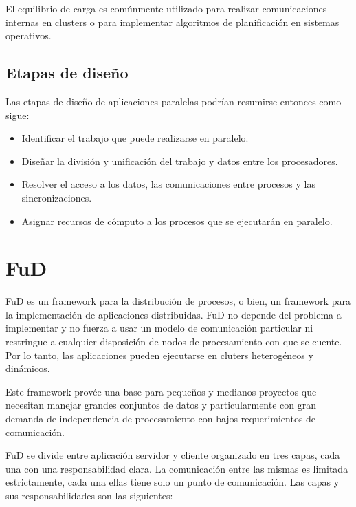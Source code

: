 El equilibrio de carga es comúnmente utilizado para realizar comunicaciones internas en clusters o para implementar algoritmos de
planificación en sistemas operativos.

\subsection{Etapas de diseño}

Las etapas de diseño de aplicaciones paralelas podrían resumirse entonces como sigue:

\begin{itemize}
 \item Identificar el trabajo que puede realizarse en paralelo.
 \item Diseñar la división y unificación del trabajo y datos entre los procesadores.
 \item Resolver el acceso a los datos, las comunicaciones entre procesos y las sincronizaciones.
 \item Asignar recursos de cómputo a los procesos que se ejecutarán en paralelo.
\end{itemize}


\section{FuD}
\label{sec:fud}

FuD es un framework para la distribución de procesos, o bien, un framework para la implementación de aplicaciones distribuidas\cite{clus09}.
FuD no depende del problema a implementar y no fuerza a usar un modelo de comunicación particular ni restringue a cualquier disposición de
nodos de procesamiento con que se cuente. Por lo tanto, las aplicaciones pueden ejecutarse en cluters heterogéneos y dinámicos.

Este framework provée una base para pequeños y medianos proyectos que necesitan manejar grandes conjuntos de datos y particularmente con
gran demanda de independencia de procesamiento con bajos requerimientos de comunicación.

FuD se divide entre aplicación servidor y cliente organizado en tres capas, cada una con una responsabilidad clara. La comunicación entre
las mismas es limitada estrictamente, cada una ellas tiene solo un punto de comunicación.
Las capas y sus responsabilidades son las siguientes:

